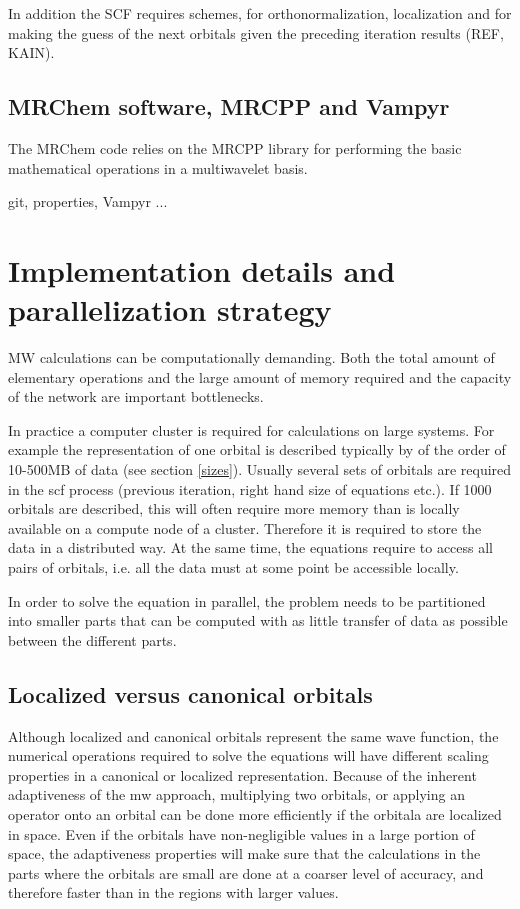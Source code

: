 \documentclass{article}
\begin{document}
In addition the SCF requires schemes, for orthonormalization, localization and for making the guess of the next orbitals given the preceding iteration results (REF, KAIN).

\subsection{MRChem software, MRCPP and Vampyr}
The MRChem code relies on the MRCPP library for performing the basic mathematical operations in a multiwavelet basis.

git, properties, Vampyr ...


\section{Implementation details and parallelization strategy}

MW calculations can be computationally demanding. Both the total amount of elementary operations and the large amount of memory required and the capacity of the network are important bottlenecks. 

In practice a computer cluster is required for calculations on large systems.
For example the representation of one orbital is described typically by of the order of 10-500MB of data (see section \ref{sizes}). Usually several sets of orbitals are required in the scf process (previous iteration, right hand size of equations etc.). If 1000 orbitals are described, this will often require more memory than is locally available on a compute node of a cluster. Therefore it is required to store the data in a distributed way. At the same time, the equations require to access all pairs of orbitals, i.e. all the data must at some point be accessible locally.

In order to solve the equation in parallel, the problem needs to be partitioned into smaller parts that can be computed with as little transfer of data as possible between the different parts.



\subsection{Localized versus canonical orbitals}

Although localized and canonical orbitals represent the same wave function, the numerical operations required to solve the equations will have different scaling properties in a canonical or localized representation.
Because of the inherent adaptiveness of the mw approach, multiplying two orbitals, or applying an operator onto an orbital can be done more efficiently if the orbitala are localized in space. Even if the orbitals have non-negligible values in a large portion of space, the adaptiveness properties will make sure that the calculations in the parts where the orbitals are small are done at a coarser level of accuracy, and therefore faster than in the regions with larger values.
\end{document}
